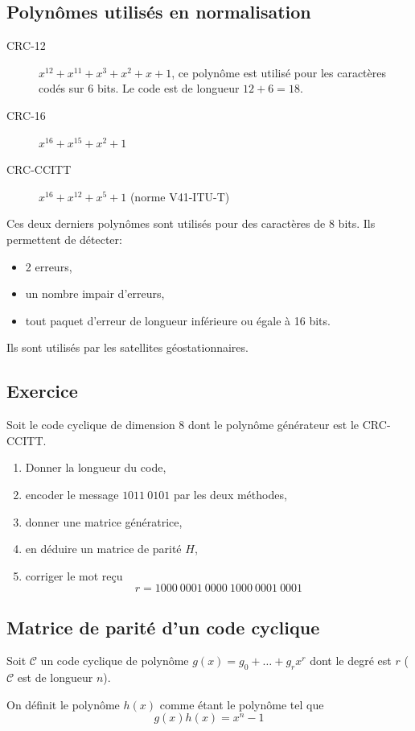 \documentclass[a4paper,10pt,twocolumn]{article}
\theoremstyle{break}
\newcommand{\code}[1]{\mathcal{#1}}
\newcommand{\C}{\code{C}}
\begin{document}
\subsection{Polynômes utilisés en normalisation}
 \begin{description}
  \item[CRC-12] $x^{12}+x^{11}+x^{3}+x^{2}+x+1$, ce polynôme est utilisé pour les caractères codés sur 6 bits. Le code est de longueur $12+6=18$.
  \item[CRC-16] $x^{16}+x^{15}+x^{2}+1$
  \item[CRC-CCITT] $x^{16}+x^{12}+x^{5}+1$ (norme V41-ITU-T)
 \end{description}
 Ces deux derniers polynômes sont utilisés pour des caractères de 8 bits. Ils permettent de détecter:
 \begin{itemize}
  \item 2 erreurs,
  \item un nombre impair d'erreurs,
  \item tout paquet d'erreur de longueur inférieure ou égale à 16 bits.
 \end{itemize}
 Ils sont utilisés par les satellites géostationnaires.

\subsection{Exercice}
Soit le code cyclique de dimension 8 dont le polynôme générateur est le CRC-CCITT. 
\begin{enumerate}
 \item Donner la longueur du code,
 \item encoder le message $1011\ 0101$ par les deux méthodes,
 \item donner une matrice génératrice,
 \item en déduire un matrice de parité $H$,
 \item corriger le mot reçu
  $$ r = 1000\ 0001\ 0000\ 1000\ 0001\ 0001 $$
\end{enumerate}

\subsection{Matrice de parité d'un code cyclique}
Soit $\C$ un code cyclique de polynôme $g(x) = g_0 + \ldots + g_r x^r$ dont le degré est $r$ ($\C$ est de longueur $n$).

On définit le polynôme $h(x)$ comme étant le polynôme tel que
$$ g(x)h(x) = x^n - 1 $$
\end{document}
